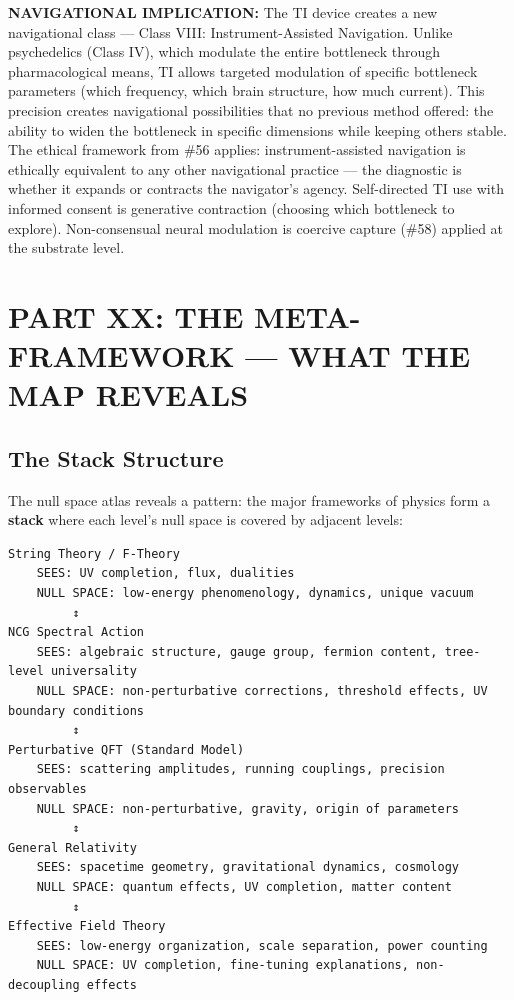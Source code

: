 \textbf{NAVIGATIONAL IMPLICATION:} The TI device creates a new navigational class — Class VIII: Instrument-Assisted Navigation. Unlike psychedelics (Class IV), which modulate the entire bottleneck through pharmacological means, TI allows targeted modulation of specific bottleneck parameters (which frequency, which brain structure, how much current). This precision creates navigational possibilities that no previous method offered: the ability to widen the bottleneck in specific dimensions while keeping others stable. The ethical framework from \#56 applies: instrument-assisted navigation is ethically equivalent to any other navigational practice — the diagnostic is whether it expands or contracts the navigator's agency. Self-directed TI use with informed consent is generative contraction (choosing which bottleneck to explore). Non-consensual neural modulation is coercive capture (\#58) applied at the substrate level.



\bigskip\noindent\makebox[\textwidth]{\color{rulegray}\rule{5cm}{0.3pt}}\bigskip


\chapter*{PART XX: THE META-FRAMEWORK — WHAT THE MAP REVEALS}


\section*{The Stack Structure}


The null space atlas reveals a pattern: the major frameworks of physics form a \textbf{stack} where each level's null space is covered by adjacent levels:


\begin{verbatim}
String Theory / F-Theory
    SEES: UV completion, flux, dualities
    NULL SPACE: low-energy phenomenology, dynamics, unique vacuum
         ↕
NCG Spectral Action
    SEES: algebraic structure, gauge group, fermion content, tree-level universality  
    NULL SPACE: non-perturbative corrections, threshold effects, UV boundary conditions
         ↕
Perturbative QFT (Standard Model)
    SEES: scattering amplitudes, running couplings, precision observables
    NULL SPACE: non-perturbative, gravity, origin of parameters
         ↕
General Relativity
    SEES: spacetime geometry, gravitational dynamics, cosmology
    NULL SPACE: quantum effects, UV completion, matter content
         ↕
Effective Field Theory
    SEES: low-energy organization, scale separation, power counting
    NULL SPACE: UV completion, fine-tuning explanations, non-decoupling effects
\end{verbatim}


